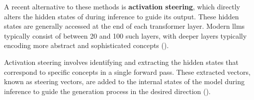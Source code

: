A recent alternative to these methods is \textbf{activation steering}, which directly alters the hidden states of  during inference to guide its output. These hidden states are generally accessed at the end of each transformer layer. Modern \acp{llm} typically consist of between \num{20} and \num{100} such layers, with deeper layers typically encoding more abstract and sophisticated concepts (\cite{bogdanEmergentEffectsScaling2025}).

Activation steering involves identifying and extracting the hidden states that correspond to specific concepts in a single forward pass. These extracted vectors, known as steering vectors, are added to the internal states of the model during inference to guide the generation process in the desired direction (\cite{konenStyleVectorsSteering2024,turnerActivationAdditionSteering2024,subramaniExtractingLatentSteering2022}).
